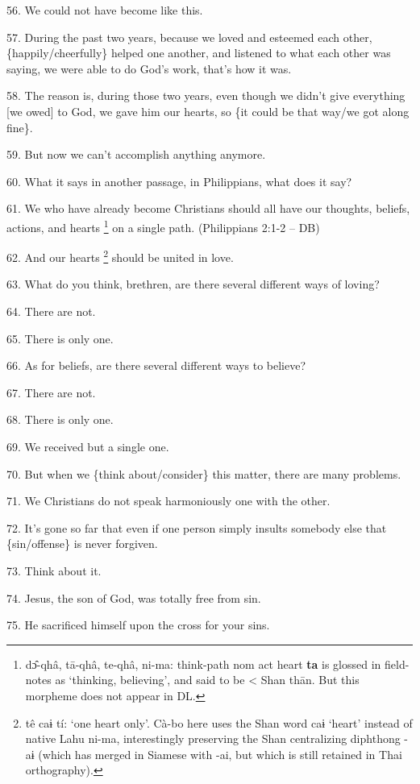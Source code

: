 56. We could not have become like this.

57. During the past two years, because we loved and esteemed each other, \{happily/cheerfully\}
helped one another, and listened to what each other was saying, we were able to
do God's work, that's how it was.

58. The reason is, during those two years, even though we didn't give everything
[we owed] to God, we gave him our hearts, so \{it could be that way/we got along
fine\}.

59. But now we can't accomplish anything anymore.

60. What it says in another passage, in Philippians, what does it say?

61. We who have already become Christians should all have our thoughts, beliefs,
actions, and hearts \footnote{dɔ̂-qhâ, tā-qhâ, te-qhâ, ni-ma:  think-path nom     act        heart  \textbf{ta} is glossed in field-notes as `thinking, believing', and said to be < Shan thān. But this morpheme does not appear in DL.} on a single path. (Philippians 2:1-2 -- DB)

62. And our hearts \footnote{tê caɨ tí: `one heart only'. Cà-bo here uses the Shan word caɨ `heart' instead of native Lahu ni-ma, interestingly preserving the Shan centralizing diphthong -aɨ (which has merged in Siamese with -ai, but which is still retained in Thai orthography).} should be united in love.

63. What do you think, brethren, are there several different ways of loving?

64. There are not.

65. There is only one.

66. As for beliefs, are there several different ways to believe?

67. There are not.

68. There is only one.

69. We received but a single one.

70. But when we \{think about/consider\} this matter, there are many problems.

71. We Christians do not speak harmoniously one with the other.

72. It's gone so far that even if one person simply insults somebody else that
\{sin/offense\} is never forgiven.

73. Think about it.

74. Jesus, the son of God, was totally free from sin.

75. He sacrificed himself upon the cross for your sins.

